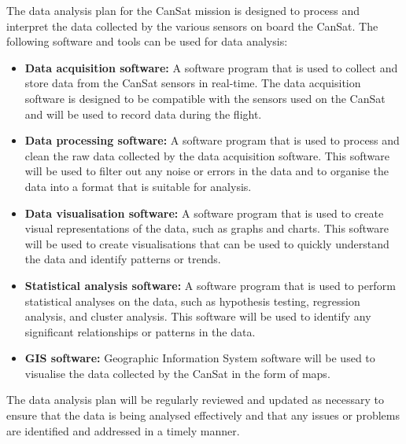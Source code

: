 \documentclass[11pt]{article}
\begin{document}
The data analysis plan for the CanSat mission is designed to process and interpret the data collected by the various sensors on board the CanSat. The following software and tools can be used for data analysis:
\begin{itemize}
  \item \textbf{Data acquisition software:} A software program that is used to collect and store data from the CanSat sensors in real-time. The data acquisition software is designed to be compatible with the sensors used on the CanSat and will be used to record data during the flight.
  \item \textbf{Data processing software:} A software program that is used to process and clean the raw data collected by the data acquisition software. This software will be used to filter out any noise or errors in the data and to organise the data into a format that is suitable for analysis.
  \item \textbf{Data visualisation software:} A software program that is used to create visual representations of the data, such as graphs and charts. This software will be used to create visualisations that can be used to quickly understand the data and identify patterns or trends.
  \item \textbf{Statistical analysis software:} A software program that is used to perform statistical analyses on the data, such as hypothesis testing, regression analysis, and cluster analysis. This software will be used to identify any significant relationships or patterns in the data.
  \item \textbf{GIS software:} Geographic Information System software will be used to visualise the data collected by the CanSat in the form of maps.
\end{itemize}

The data analysis plan will be regularly reviewed and updated as necessary to ensure that the data is being analysed effectively and that any issues or problems are identified and addressed in a timely manner.
\end{document}
